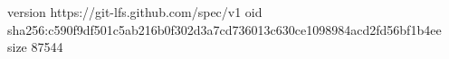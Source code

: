 version https://git-lfs.github.com/spec/v1
oid sha256:c590f9df501c5ab216b0f302d3a7cd736013c630ce1098984acd2fd56bf1b4ee
size 87544
